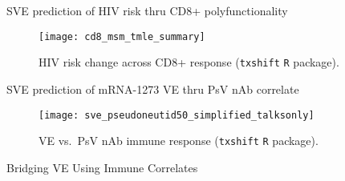 \documentclass{beamer}
\begin{document}





\begin{frame}[c]{SVE prediction of HIV risk thru CD8+ polyfunctionality}

\vspace{-0.3in}
\begin{figure}[H]
  \centering
  \texttt{[image: cd8\_msm\_tmle\_summary]}
  \captionsetup{labelformat=empty}
  \vspace{-1.5em}
  \caption{
    HIV risk change across CD8+ response (\texttt{txshift} \texttt{R}
    package).
  }
\end{figure}

\note{
}

\end{frame}


\begin{frame}[c]{SVE prediction of mRNA-1273 VE thru PsV nAb correlate}

\vspace*{-0.25cm}

\begin{figure}[H]
\centering
\texttt{[image: sve\_pseudoneutid50\_simplified\_talksonly]}
\caption{
  VE vs.~PsV nAb immune response (\texttt{txshift} \texttt{R} package).
}
\end{figure}

\note{
}

\end{frame}


\begin{frame}[standout]
  Bridging VE Using Immune Correlates
\end{frame}

\end{document}

